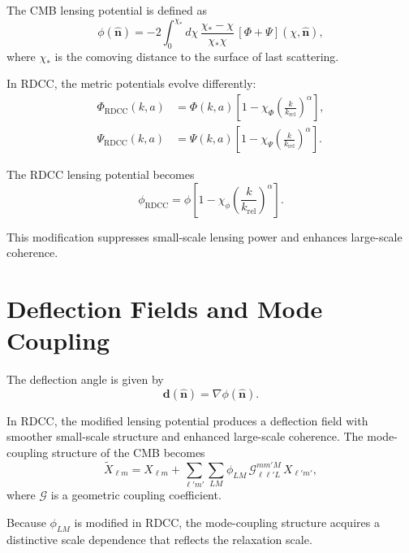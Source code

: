 \documentclass[11pt,a4paper]{article}
\begin{document}
The CMB lensing potential is defined as
\begin{equation}
    \phi(\hat{\mathbf{n}})
    = -2 \int_{0}^{\chi_{*}}
      d\chi\,
      \frac{\chi_{*} - \chi}{\chi_{*}\chi}\,
      \left[\Phi + \Psi\right](\chi,\hat{\mathbf{n}}),
\end{equation}
where $\chi_{*}$ is the comoving distance to the surface of last scattering.

In RDCC, the metric potentials evolve differently:
\begin{align}
    \Phi_{\mathrm{RDCC}}(k,a)
    &= \Phi(k,a)
       \left[
         1 - \chi_{\Phi}
         \left(\frac{k}{k_{\mathrm{rel}}}\right)^{\alpha}
       \right], \\
    \Psi_{\mathrm{RDCC}}(k,a)
    &= \Psi(k,a)
       \left[
         1 - \chi_{\Psi}
         \left(\frac{k}{k_{\mathrm{rel}}}\right)^{\alpha}
       \right].
\end{align}

The RDCC lensing potential becomes
\begin{equation}
    \phi_{\mathrm{RDCC}}
    = \phi
      \left[
        1 - \chi_{\phi}
        \left(\frac{k}{k_{\mathrm{rel}}}\right)^{\alpha}
      \right].
\end{equation}

This modification suppresses small-scale lensing power and enhances large-scale 
coherence.
\section{Deflection Fields and Mode Coupling}

The deflection angle is given by
\begin{equation}
    \mathbf{d}(\hat{\mathbf{n}})
    = \nabla \phi(\hat{\mathbf{n}}).
\end{equation}

In RDCC, the modified lensing potential produces a deflection field with smoother 
small-scale structure and enhanced large-scale coherence. The mode-coupling 
structure of the CMB becomes
\begin{equation}
    \tilde{X}_{\ell m}
    = X_{\ell m}
      + \sum_{\ell' m'}
        \sum_{LM}
        \phi_{LM}\,
        \mathcal{G}_{\ell \ell' L}^{m m' M}\,
        X_{\ell' m'},
\end{equation}
where $\mathcal{G}$ is a geometric coupling coefficient.

Because $\phi_{LM}$ is modified in RDCC, the mode-coupling structure acquires a 
distinctive scale dependence that reflects the relaxation scale.
\end{document}

